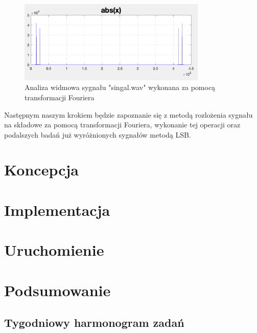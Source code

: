 \documentclass[a4paper,titleauthor]{mwart}
\begin{document}
\begin{figure}[h]
	\centering
	\includegraphics[width=0.8\textwidth]{widmo_F}
	\caption{Analiza widmowa sygnału "singal.wav" wykonana za pomocą transformacji Fouriera}
\end{figure}

Następnym naszym krokiem będzie zapoznanie się z metodą rozlożenia sygnału na składowe za pomocą transformacji Fouriera, wykonanie tej operacji oraz podalszych badań już wyróżnionych sygnałów metodą LSB.

\section{Koncepcja}
\label{sec:koncepcja}

\section{Implementacja}
\label{sec:implementacja}


\section{Uruchomienie}
\label{sec:uruchomienie}


\section{Podsumowanie}
\label{sec:podsumowanie}

\subsection{Tygodniowy harmonogram zadań}
\end{document}
